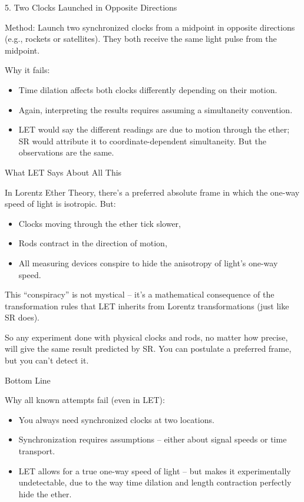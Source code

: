\documentclass[a4paper]{article}
\theoremstyle{plain}
\theoremstyle{definition}
\begin{document}
5. Two Clocks Launched in Opposite Directions

Method: Launch two synchronized clocks from a midpoint in opposite
directions (e.g., rockets or satellites).  They both receive the same
light pulse from the midpoint.

Why it fails:
\begin{itemize}
\item Time dilation affects both clocks differently depending on their
  motion.
\item Again, interpreting the results requires assuming a simultaneity
  convention.
\item LET would say the different readings are due to motion through
  the ether; SR would attribute it to coordinate-dependent
  simultaneity.  But the observations are the same.
\end{itemize}

What LET Says About All This

In Lorentz Ether Theory, there's a preferred absolute frame in which
the one-way speed of light is isotropic.  But:
\begin{itemize}
\item Clocks moving through the ether tick slower,
\item Rods contract in the direction of motion,
\item All measuring devices conspire to hide the anisotropy of light's
  one-way speed.
\end{itemize}
This ``conspiracy'' is not mystical -- it's a mathematical consequence
of the transformation rules that LET inherits from Lorentz
transformations (just like SR does).

So any experiment done with physical clocks and rods, no matter how
precise, will give the same result predicted by SR.  You can postulate
a preferred frame, but you can't detect it.

Bottom Line

Why all known attempts fail (even in LET):
\begin{itemize}
\item You always need synchronized clocks at two locations.
\item Synchronization requires assumptions -- either about signal
  speeds or time transport.
\item LET allows for a true one-way speed of light -- but makes it
  experimentally undetectable, due to the way time dilation and length
  contraction perfectly hide the ether.
\end{itemize}
\end{document}
